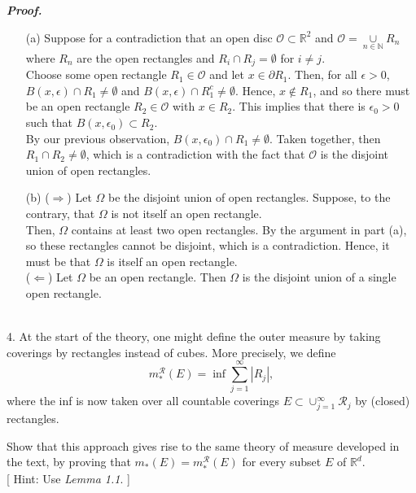 \documentclass[a4paper,11pt]{article}
\begin{document}
\textbf{\textit{Proof.}}
\begin{enumerate}
	\item [(a)]
		Suppose for a contradiction that an open disc $\mathcal{O} \subset \mathbb{R}^2$ and $\mathcal{O} = \underset{n \in \mathbb{N}}{\cup}R_n$ where $R_n$ are the open rectangles and $R_i \cap R_j = \emptyset$ for $i \neq j$.\\

		Choose some open rectangle $R_1 \in \mathcal{O}$ and let $x \in \partial R_1$. Then, for all $\epsilon > 0$, $B(x,\epsilon) \cap R_1 \neq \emptyset$ and $B(x,\epsilon) \cap R_1^c \neq \emptyset$. Hence, $x \notin R_1$, and so there must be an open rectangle $R_2 \in \mathcal{O}$ with $x \in R_2$. This implies that there is $\epsilon_0 > 0$ such that $B(x,\epsilon_0) \subset R_2$.\\

		By our previous observation, $B(x,\epsilon_0) \cap R_1 \neq \emptyset$. Taken together, then $R_1 \cap R_2 \neq \emptyset$, which is a contradiction with the fact that $\mathcal{O}$ is the disjoint union of open rectangles.\\

	\item [(b)]
		($\Rightarrow$)
		Let $\Omega$ be the disjoint union of open rectangles. Suppose, to the contrary, that $\Omega$ is not itself an open rectangle.\\

		Then, $\Omega$ contains at least two open rectangles. By the argument in part (a), so these rectangles cannot be disjoint, which is a contradiction. Hence, it must be that $\Omega$ is itself an open rectangle.\\

		($\Leftarrow$) Let $\Omega$ be an open rectangle. Then $\Omega$ is the disjoint union of a single open rectangle.\\\\
\end{enumerate}


4. At the start of the theory, one might define the outer measure by taking coverings by rectangles instead of cubes. More precisely, we define
	$$m_*^\mathcal{R}(E) = \inf \sum_{j = 1}^\infty |R_j|,$$
where the inf is now taken over all countable coverings $E \subset \cup_{j = 1}^\infty \mathcal{R}_j$ by (closed) rectangles.

Show that this approach gives rise to the same theory of measure developed in the text, by proving that $m_*(E) = m_*^\mathcal{R}(E)$ for every subset $E$ of $\mathbb{R}^d$.\\
{[}
Hint: Use \textit{Lemma 1.1}.
{]}\\
\end{document}
